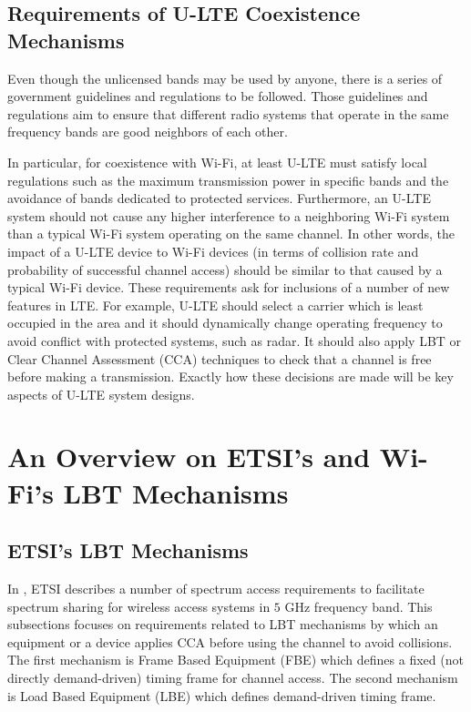 \documentclass[journal,draftclsnofoot,12pt,onecolumn]{IEEEtran}
\begin{document}
\subsection{Requirements of U-LTE Coexistence Mechanisms}

\noindent Even though the unlicensed bands may be used by anyone, there is a series of government guidelines and regulations to be followed. Those guidelines and regulations aim to ensure that different radio systems that operate in the same frequency bands are good neighbors of each other.

In particular, for coexistence with Wi-Fi, at least U-LTE must satisfy local regulations such as the maximum transmission power in specific bands and the avoidance of bands dedicated to protected services. Furthermore, an U-LTE system should not cause any higher interference to a neighboring Wi-Fi system than a typical Wi-Fi system operating on the same channel. In other words, the impact of a U-LTE device to Wi-Fi devices (in terms of collision rate and probability of successful channel access) should be similar to that caused by a typical Wi-Fi device. These requirements ask for inclusions of a number of new features in LTE. For example, U-LTE should select a carrier which is least occupied in the area and it should dynamically change operating frequency to avoid conflict with protected systems, such as radar. It should also apply LBT or Clear Channel Assessment (CCA) techniques to check that a channel is free before making a transmission. Exactly how these decisions are made will be key aspects of U-LTE system designs.


\section{An Overview on ETSI's and Wi-Fi's LBT Mechanisms}
\label{sec:LBT-overview}

\subsection{ETSI's LBT Mechanisms}
\label{subsec:ETSI-LBT-overview}

In \cite{LBT-ETSI-2014}, ETSI describes a number of spectrum access requirements to facilitate spectrum sharing for wireless access systems in $5$ GHz frequency band. This subsections focuses on requirements related to LBT mechanisms by which an equipment or a device applies CCA before using the channel to avoid collisions. The first mechanism is Frame Based Equipment (FBE) which defines a fixed (not directly demand-driven) timing frame for channel access. The second mechanism is Load Based Equipment (LBE) which defines demand-driven timing frame.
\end{document}
